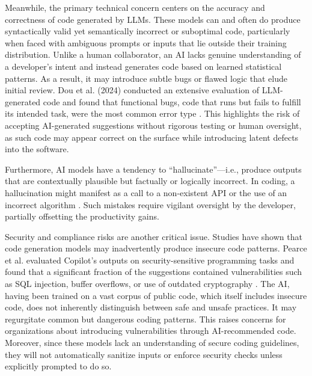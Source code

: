 Meanwhile, the primary technical concern centers on the accuracy and correctness of code generated by \glspl{LLM}. These models can and often do produce syntactically valid yet semantically incorrect or suboptimal code, particularly when faced with ambiguous prompts or inputs that lie outside their training distribution. Unlike a human collaborator, an \gls{AI} lacks genuine understanding of a developer’s intent and instead generates code based on learned statistical patterns. As a result, it may introduce subtle bugs or flawed logic that elude initial review. Dou et al. (2024) conducted an extensive evaluation of \gls{LLM}-generated code and found that functional bugs, code that runs but fails to fulfill its intended task, were the most common error type \autocite{Dou2024}. This highlights the risk of accepting \gls{AI}-generated suggestions without rigorous testing or human oversight, as such code may appear correct on the surface while introducing latent defects into the software.

Furthermore, \gls{AI} models have a tendency to ``hallucinate''---i.e., produce outputs that are contextually plausible but factually or logically incorrect. In coding, a hallucination might manifest as a call to a non-existent API or the use of an incorrect algorithm \autocite{Tian2024}. Such mistakes require vigilant oversight by the developer, partially offsetting the productivity gains.

Security and compliance risks are another critical issue. Studies have shown that code generation models may inadvertently produce insecure code patterns. Pearce et al. evaluated Copilot’s outputs on security-sensitive programming tasks and found that a significant fraction of the suggestions contained vulnerabilities such as SQL injection, buffer overflows, or use of outdated cryptography \autocite{Pearce2022}. The \gls{AI}, having been trained on a vast corpus of public code, which itself includes insecure code, does not inherently distinguish between safe and unsafe practices. It may regurgitate common but dangerous coding patterns. This raises concerns for organizations about introducing vulnerabilities through \gls{AI}-recommended code. Moreover, since these models lack an understanding of secure coding guidelines, they will not automatically sanitize inputs or enforce security checks unless explicitly prompted to do so.

